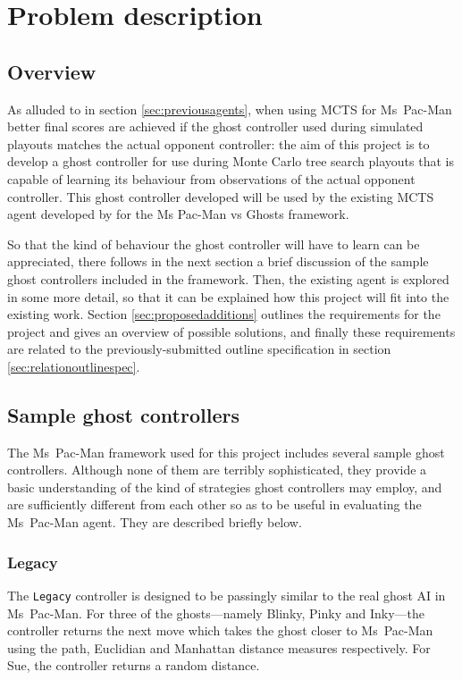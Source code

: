 \chapter{Problem description}
\label{ch:problem}

\section{Overview}

As alluded to in section \ref{sec:previousagents}, when using MCTS for Ms~Pac-Man better final scores are achieved if the ghost controller used during simulated playouts matches the actual opponent controller: the aim of this project is to develop a ghost controller for use during Monte Carlo tree search playouts that is capable of learning its behaviour from observations of the actual opponent controller.  This ghost controller developed will be used by the existing MCTS agent developed by \citet{Me2012} for the Ms Pac-Man vs Ghosts framework.

So that the kind of behaviour the ghost controller will have to learn can be appreciated, there follows in the next section a brief discussion of the sample ghost controllers included in the framework.  Then, the existing agent is explored in some more detail, so that it can be explained how this project will fit into the existing work.  Section \ref{sec:proposedadditions} outlines the requirements for the project and gives an overview of possible solutions, and finally these requirements are related to the previously-submitted outline specification in section \ref{sec:relationoutlinespec}.


\section{Sample ghost controllers}
\label{sec:sampleghosts}

The Ms~Pac-Man framework used for this project includes several sample ghost controllers.  Although none of them are terribly sophisticated, they provide a basic understanding of the kind of strategies ghost controllers may employ, and are sufficiently different from each other so as to be useful in evaluating the Ms~Pac-Man agent.  They are described briefly below.

\subsection{Legacy}
\label{sec:legacy}
The {\tt Legacy} controller is designed to be passingly similar to the real ghost AI in Ms~Pac-Man.  For three of the ghosts---namely Blinky, Pinky and Inky---the controller returns the next move which takes the ghost closer to Ms~Pac-Man using the path, Euclidian and Manhattan distance measures respectively.  For Sue, the controller returns a random distance.

